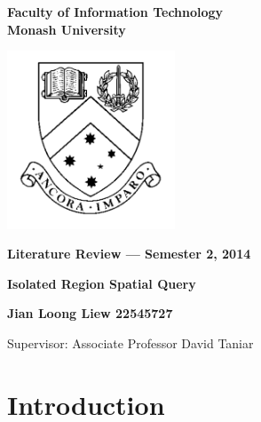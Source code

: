 \documentclass[a4paper,11pt]{article}
\begin{document}
\thispagestyle{empty} %
\renewcommand{\thepage}{\roman{page}}

\begin{spacing}{1.5}
\begin{center}
{\Large \bfseries
Faculty of Information Technology\\
Monash University}

\vspace*{30mm}

\includegraphics[width=5cm]{MonashCrest}

\vspace*{15mm}

{\large \bfseries
Literature Review --- Semester 2, 2014
}

\vspace*{10mm}

{\LARGE \bfseries
Isolated Region Spatial Query
}

\vspace*{20mm}

{\large \bfseries
Jian Loong Liew 22545727

\vspace*{20mm}

Supervisor: Associate Professor David Taniar
}

\end{center}
\end{spacing}

\newpage

\tableofcontents

\newpage
\setcounter{page}{1}
\renewcommand{\thepage}{\arabic{page}}

\section{Introduction} 
\label{Introduction}
\end{document}

